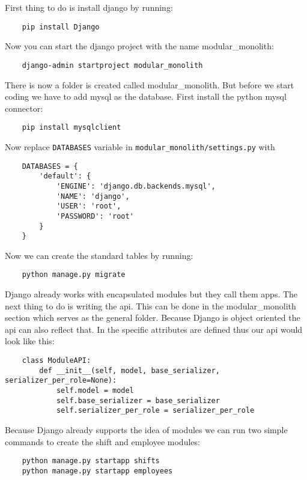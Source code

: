 First thing to do is install django by running:
\begin{verbatim}
    pip install Django
\end{verbatim}

Now you can start the django project with the name modular\_monolith:
\begin{verbatim}
    django-admin startproject modular_monolith
\end{verbatim}

There is now a folder is created called modular\_monolith. But before we start coding we have to add mysql as the database. First install the python mysql connector:
\begin{verbatim}
    pip install mysqlclient
\end{verbatim}

Now replace \texttt{DATABASES} variable in \texttt{modular\_monolith/settings.py} with
\begin{verbatim}
    DATABASES = {
        'default': {
            'ENGINE': 'django.db.backends.mysql',
            'NAME': 'django',
            'USER': 'root',
            'PASSWORD': 'root'
        }
    }
\end{verbatim}

Now we can create the standard tables by running:
\begin{verbatim}
    python manage.py migrate
\end{verbatim}

Django already works with encapsulated modules but they call them apps. The next thing to do is writing the api. This can be done in the modular\_monolith section which serves as the general folder. Because Django is object oriented the api can also reflect that. In  the specific attributes are defined thus our api would look like this:
\begin{verbatim}
    class ModuleAPI:
        def __init__(self, model, base_serializer, serializer_per_role=None):
            self.model = model
            self.base_serializer = base_serializer
            self.serializer_per_role = serializer_per_role
\end{verbatim}

Because Django already supports the idea of modules we can run two simple commands to create the shift and employee modules:
\begin{verbatim}
    python manage.py startapp shifts
    python manage.py startapp employees
\end{verbatim}

